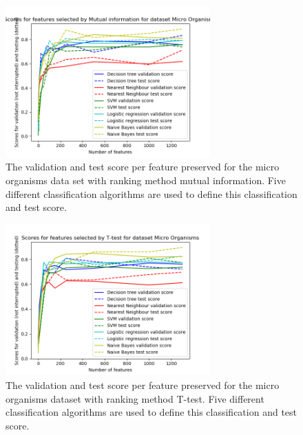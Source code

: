 \documentclass[10pt,a4paper]{report}
\begin{document}
	\begin{figure}[H]
		\includegraphics[width=0.7\textwidth]{MO_MI_Val_Test_Score.png}
		\caption{The validation and test score per feature preserved for the micro organisms data set with ranking method mutual information. Five different classification algorithms are used to define this classification and test score.}
		\label{fig:MO_MI_Val_Test_Score}
	\end{figure}
	
	\begin{figure}[H]
		\includegraphics[width=0.7\textwidth]{MO_T_Val_Test_Score.png}
		\caption{The validation and test score per feature preserved for the micro organisms dataset with ranking method T-test. Five different classification algorithms are used to define this classification and test score.}
		\label{fig:MO_T_Val_Test_Score}
	\end{figure}
	
\end{document}
